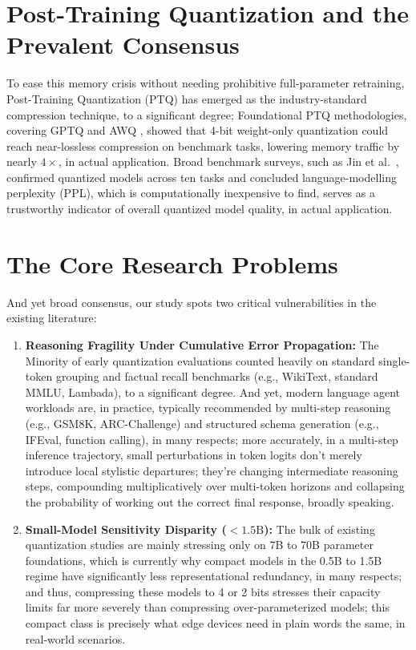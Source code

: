 \documentclass[12pt,a4paper,oneside]{report}
\begin{document}
    \section{Post-Training Quantization and the Prevalent Consensus}
    To ease this memory crisis without needing prohibitive full-parameter retraining, Post-Training Quantization (PTQ) has emerged as the industry-standard compression technique, to a significant degree; Foundational PTQ methodologies, covering GPTQ \cite{frantar2023gptq} and AWQ \cite{lin2024awq}, showed that 4-bit weight-only quantization could reach near-lossless compression on benchmark tasks, lowering memory traffic by nearly $4\times$, in actual application. Broad benchmark surveys, such as Jin et al.~\cite{jin2024comprehensive}, confirmed quantized models across ten tasks and concluded language-modelling perplexity (PPL), which is computationally inexpensive to find, serves as a trustworthy indicator of overall quantized model quality, in actual application.

    \section{The Core Research Problems}
    And yet broad consensus, our study spots two critical vulnerabilities in the existing literature:
    \begin{enumerate}[leftmargin=*]
        \item \textbf{Reasoning Fragility Under Cumulative Error Propagation:} The Minority of early quantization evaluations counted heavily on standard single-token grouping and factual recall benchmarks (e.g., WikiText, standard MMLU, Lambada), to a significant degree. And yet, modern language agent workloads are, in practice, typically recommended by multi-step reasoning (e.g., GSM8K, ARC-Challenge) and structured schema generation (e.g., IFEval, function calling), in many respects; more accurately, in a multi-step inference trajectory, small perturbations in token logits don't merely introduce local stylistic departures; they're changing intermediate reasoning steps, compounding multiplicatively over multi-token horizons and collapsing the probability of working out the correct final response, broadly speaking.
        \item \textbf{Small-Model Sensitivity Disparity ($<1.5\text{B}$):} The bulk of existing quantization studies are mainly stressing only on 7B to 70B parameter foundations, which is currently why compact models in the 0.5B to 1.5B regime have significantly less representational redundancy, in many respects; and thus, compressing these models to 4 or 2 bits stresses their capacity limits far more severely than compressing over-parameterized models; this compact class is precisely what edge devices need in plain words the same, in real-world scenarios.
    \end{enumerate}
\end{document}
